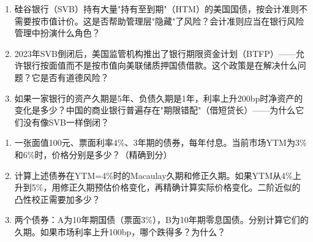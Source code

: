 \documentclass[a4paper,11pt]{ctexbook}
\begin{document}
\begin{discuss}
\begin{enumerate}
  \item 硅谷银行（SVB）持有大量"持有至到期"（HTM）的美国国债，按会计准则不需要按市值计价。这是否帮助管理层"隐藏"了风险？会计准则应当在银行风险管理中扮演什么角色？
  \item 2023年SVB倒闭后，美国监管机构推出了银行期限资金计划（BTFP）——允许银行按面值而不是按市值向美联储质押国债借款。这个政策是在解决什么问题？它是否有道德风险？
  \item 如果一家银行的资产久期是5年、负债久期是1年，利率上升200bp时净资产的变化是多少？中国的商业银行普遍存在"期限错配"（借短贷长）——为什么它们没有像SVB一样倒闭？
\end{enumerate}
\end{discuss}

\begin{exercises}
\begin{enumerate}
  \item 一张面值100元、票面利率4\%、3年期的债券，每年付息。当前市场YTM为3\%和6\%时，价格分别是多少？（精确到分）
  \item 计算上述债券在YTM=4\%时的Macaulay久期和修正久期。如果YTM从4\%上升到5\%，用修正久期预估价格变化，再精确计算实际价格变化。二阶近似的凸性校正需要加多少？
  \item 两个债券：A为10年期国债（票面3\%），B为10年期零息国债。分别计算它们的久期。如果市场利率上升100bp，哪个跌得多？为什么？
\end{enumerate}
\end{exercises}
\end{document}
